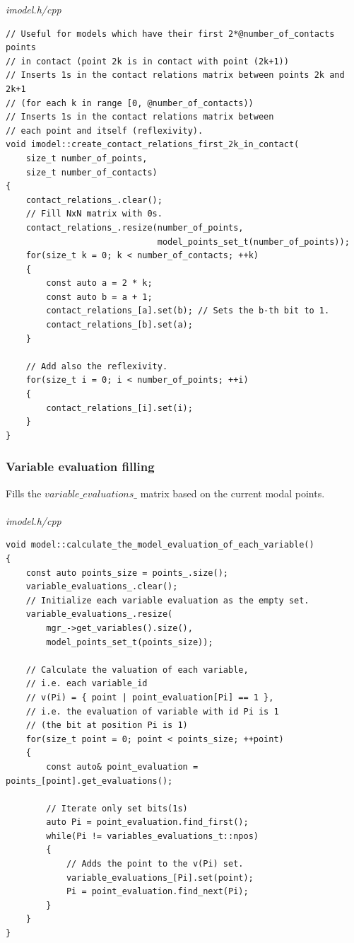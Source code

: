 \documentclass{article}
\begin{document}
\newpage
\noindent
\textit{imodel.h/cpp}
\begin{lstlisting}
// Useful for models which have their first 2*@number_of_contacts points
// in contact (point 2k is in contact with point (2k+1))
// Inserts 1s in the contact relations matrix between points 2k and 2k+1
// (for each k in range [0, @number_of_contacts))
// Inserts 1s in the contact relations matrix between
// each point and itself (reflexivity).
void imodel::create_contact_relations_first_2k_in_contact(
	size_t number_of_points,
	size_t number_of_contacts)
{
    contact_relations_.clear();
    // Fill NxN matrix with 0s.
    contact_relations_.resize(number_of_points,
                              model_points_set_t(number_of_points));
    for(size_t k = 0; k < number_of_contacts; ++k)
    {
        const auto a = 2 * k;
        const auto b = a + 1;
        contact_relations_[a].set(b); // Sets the b-th bit to 1.
        contact_relations_[b].set(a);
    }

    // Add also the reflexivity.
    for(size_t i = 0; i < number_of_points; ++i)
    {
        contact_relations_[i].set(i);
    }
}
\end{lstlisting}

	\newpage
	\subsubsection*{Variable evaluation filling}
	Fills the $variable\_evaluations\_$ matrix based on the current modal points.
\\
\\
\noindent
\textit{imodel.h/cpp}
\begin{lstlisting}
void model::calculate_the_model_evaluation_of_each_variable()
{
    const auto points_size = points_.size();
    variable_evaluations_.clear();
    // Initialize each variable evaluation as the empty set.
    variable_evaluations_.resize(
        mgr_->get_variables().size(),
        model_points_set_t(points_size));

    // Calculate the valuation of each variable,
    // i.e. each variable_id
    // v(Pi) = { point | point_evaluation[Pi] == 1 },
    // i.e. the evaluation of variable with id Pi is 1
    // (the bit at position Pi is 1)
    for(size_t point = 0; point < points_size; ++point)
    {
        const auto& point_evaluation = points_[point].get_evaluations();

        // Iterate only set bits(1s)
        auto Pi = point_evaluation.find_first();
        while(Pi != variables_evaluations_t::npos)
        {
            // Adds the point to the v(Pi) set.
            variable_evaluations_[Pi].set(point);
            Pi = point_evaluation.find_next(Pi);
        }
    }
}
\end{lstlisting}
\end{document}
